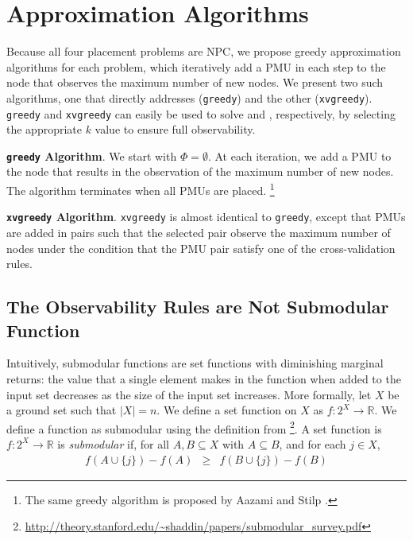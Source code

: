 \section{Approximation Algorithms}
\label{sec:approx}

Because all four placement problems are NPC, we propose greedy approximation algorithms for each problem, which iteratively add 
a PMU in each step to the node that observes the maximum number of new nodes. We present two such algorithms, one that directly addresses \maxinc ({\tt greedy}) and the other 
\xvalpart ({\tt xvgreedy}). {\tt greedy} and {\tt xvgreedy} can easily be used to solve \full and \xvals, respectively, by selecting the appropriate $k$ value to ensure full observability.

{\bf {\tt greedy} Algorithm}. We start with $\Phi = \emptyset$.  At each iteration, we add a PMU to the node that results in the observation of the maximum number of 
new nodes. The algorithm terminates when all PMUs are placed.  {\footnote {\small The same greedy algorithm is proposed by Aazami and Stilp \cite{Aazami07}. }}


{\bf {\tt xvgreedy} Algorithm}. {\tt xvgreedy} is almost identical to {\tt greedy}, except that PMUs are added in pairs such that the selected pair observe
the maximum number of nodes under the condition that the PMU pair satisfy one of the cross-validation rules. %





\subsection{The Observability Rules are Not Submodular Function}

Intuitively, submodular functions are set functions with diminishing marginal returns: the value that a single element makes in the function when added to the input set decreases
as the size of the input set increases. More formally, let $X$ be a ground set such that $|X|=n$. We define a set function on $X$ as $f: 2^X \rightarrow \mathbb{R}$.
We define a function as submodular using the definition from \footnote{\url{http://theory.stanford.edu/~shaddin/papers/submodular\_survey.pdf}}.
A set function is $f: 2^X \rightarrow \mathbb{R}$ is \emph{submodular} if, for all $A,B \subseteq X$ with $A \subseteq B$, and for each $j \in X$,
\begin{eqnarray}
f(A \cup \{j\}) - f(A) &\geq& f(B \cup \{j\}) - f(B)
\end{eqnarray}


